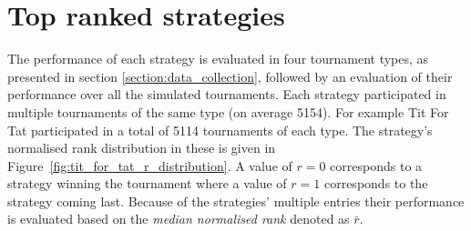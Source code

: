 \begin{table}[!htbp]
    \begin{center}
\end{center}
\caption{Output result of a single tournament.}\label{table:output_result}
\end{table}

\section{Top ranked strategies}\label{section:top_performances}

The performance of each strategy is evaluated in four tournament types, as
presented in section \ref{section:data_collection}, followed by an
evaluation of their performance over all the \numberofalltournaments simulated
tournaments. Each strategy participated in multiple tournaments of
the same type (on average 5154). For example Tit For Tat participated in a
total of 5114 tournaments of each type. The strategy's normalised rank
distribution in these is given in Figure~\ref{fig:tit_for_tat_r_distribution}. A
value of \(r = 0\) corresponds to a strategy winning the tournament where a
value of \(r = 1\) corresponds to the strategy coming last. Because of the
strategies' multiple entries their performance is evaluated based on the
\textit{median normalised rank} denoted as \(\bar{r}\).

